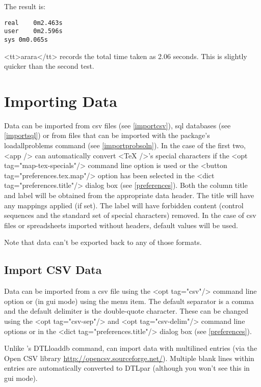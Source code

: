    The result is:

\begin{verbatim}
real	0m2.463s
user	0m2.596s
sys	0m0.065s
\end{verbatim}

  <tt>arara</tt> records the total time taken as 2.06 seconds.
  This is slightly quicker than the second  test.


\chapter{Importing Data}\label{import}

   Data can be imported from \gls{csv} files (see 
   \autoref{importcsv}), \gls{sql} databases (see 
   \autoref{importsql}) or from files that can be imported with 
   the  package's \gls{loadallproblems} command
   (see \autoref{importprobsoln}). In the case of the first
   two, <app /> can automatically convert <TeX />'s special characters if the
   <opt tag="map-tex-specials"/> command line option is used or the
   <button tag="preferences.tex.map"/> option has been selected in the 
   <dict tag="preferences.title"/> dialog box (see \autoref{preferences}).
   Both the column title and label will be obtained from the appropriate data 
   header.  The title will have any mappings applied (if set). The label will 
   have forbidden content (control sequences and the standard set of special 
   characters) removed. In the case of \gls{csv} files or spreadsheets
   imported without headers, default values will be used.


   Note that data can't be exported back to any of those formats.


\section{Import CSV Data}\label{importcsv}

   Data can be imported from a \gls{csv} file using
   the <opt tag="csv"/> command line option or (in \gls{gui} mode)
   using the  menu item. The default
   separator is a comma and the default delimiter is the double-quote
   character. These can be changed using the <opt tag="csv-sep"/> and 
   <opt tag="csv-delim"/> command line options or in the 
   <dict tag="preferences.title"/>
   dialog box (see \autoref{preferences}).

Unlike 's
   \gls{DTLloaddb} command,  can import data with multilined
   entries (via the Open CSV library 
   \url{http://opencsv.sourceforge.net/}).
   Multiple blank lines within entries are automatically converted to
   \gls{DTLpar} (although you won't see this in \gls{gui}
   mode).



